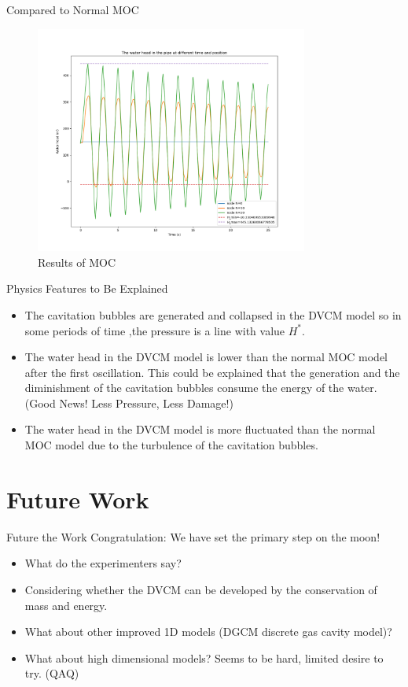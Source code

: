 \documentclass[UTF8]{ctexbeamer}
\begin{document}
\begin{frame}{Compared to Normal MOC}
    \begin{figure}
        \centering
        \includegraphics[width=0.8\textwidth]{pic/MOC_Waterhead.png}
        \caption{Results of MOC}
    \end{figure}
\end{frame}

\begin{frame}{Physics Features to Be Explained}
    \begin{itemize}
        \item The cavitation bubbles are generated and collapsed in the DVCM model so in some periods of time ,the pressure is a line with value $H^*$.
        \item The water head in the DVCM model is lower than the normal MOC model after the first oscillation. This could be explained that the generation and the diminishment of the cavitation bubbles consume the energy of the water.\\
        (Good News! Less Pressure, Less Damage!)
        \item The water head in the DVCM model is more fluctuated than the normal MOC model due to the turbulence of the cavitation bubbles.
    \end{itemize}
\end{frame}

\section{Future Work}

\begin{frame}{Future the Work}
    Congratulation: We have set the primary step on the moon!
    \begin{itemize}
        \item What do the experimenters say?
        \item Considering whether the DVCM can be developed by the conservation of mass and energy.
        \item What about other improved 1D models (DGCM discrete gas cavity model)?
        \item What about high dimensional models? Seems to be hard, limited desire to try. (QAQ)
    \end{itemize}
\end{frame}
\end{document}
